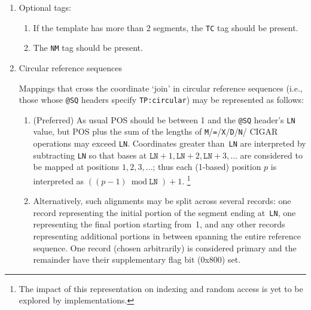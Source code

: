 \documentclass[10pt]{article}
\newcommand*{\cigarops}[1]{\cigaropsAux#1*}
\def\cigaropsAux#1#2*{{\tt #1}\if\relax\detokenize{#2}\relax\else/\cigaropsAux#2*\fi}
\begin{document}
\begin{enumerate}
\begin{enumerate}[label=\arabic*]
	alignment flag bit (0x100) unset. {\sf RNEXT} and {\sf PNEXT} point to the
	primary line of the next read in the template.
  \item {\sf SEQ} and {\sf QUAL} of secondary alignments should be set
    to `*' to reduce the file size.
  \end{enumerate}
\item Optional tags:
  \begin{enumerate}[label=\arabic*]
  \item If the template has more than 2 segments, the {\tt TC} tag
    should be present.
  \item The {\tt NM} tag should be present.
  \end{enumerate}

\item Circular reference sequences

Mappings that cross the coordinate `join' in circular reference sequences (i.e., those whose {\tt @SQ} headers specify {\tt TP:circular}) may be represented as follows:
  \begin{enumerate}[label=\arabic*]
  \item (Preferred)
As usual {\sf POS} should be between 1 and the {\tt @SQ} header's {\tt LN} value, but {\sf POS} plus the sum of the lengths of \cigarops{M=XDN} {\sf CIGAR} operations may exceed {\tt LN}.
Coordinates greater than~{\tt LN} are interpreted by subtracting {\tt LN} so that bases at $\texttt{LN}+1, \texttt{LN}+2, \texttt{LN}+3, \ldots$ are considered to be mapped at positions $1,2,3,\ldots$; thus each (1-based) position $p$ is interpreted as $((p-1)\bmod\texttt{LN})+1$.%
\footnote{The impact of this representation on indexing and random access is yet to be explored by implementations.}

  \item
Alternatively, such alignments may be split across several records: one record representing the initial portion of the segment ending at~{\tt LN}, one representing the final portion starting from~1, and any other records representing additional portions in between spanning the entire reference sequence.
One record (chosen arbitrarily) is considered primary and the remainder have their {\sf supplementary} flag bit (0x800) set.
  \end{enumerate}


\end{enumerate}
\end{document}
